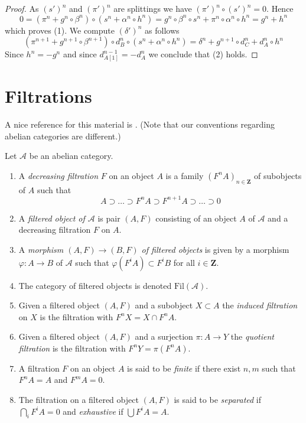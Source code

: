 \begin{proof}
As $(s')^n$ and $(\pi')^n$ are splittings we have $(\pi')^n \circ (s')^n = 0$.
Hence
$$
0 = ( \pi^n + g^n \circ \beta^n ) \circ ( s^n + \alpha^n \circ h^n ) =
g^n \circ \beta^n \circ s^n + \pi^n \circ \alpha^n \circ h^n =
g^n + h^n
$$
which proves (1). We compute $(\delta')^n$ as follows
$$
( \pi^{n + 1} + g^{n + 1} \circ \beta^{n + 1} )
\circ d_B^n \circ
( s^n + \alpha^n \circ h^n )
= \delta^n + g^{n + 1} \circ d_C^n + d_A^n \circ h^n
$$
Since $h^n = -g^n$ and since $d_{A[1]}^{n - 1} = -d_A^n$ we conclude that (2)
holds.
\end{proof}










\section{Filtrations}
\label{section-filtrations}

\noindent
A nice reference for this material is \cite[Section 1]{HodgeII}.
(Note that our conventions regarding abelian categories are different.)

\begin{definition}
\label{definition-filtered}
Let $\mathcal{A}$ be an abelian category.
\begin{enumerate}
\item A {\it decreasing filtration} $F$ on an object $A$
is a family $(F^nA)_{n \in \mathbf{Z}}$ of subobjects of $A$ such that
$$
A \supset \ldots \supset F^nA \supset F^{n + 1}A \supset \ldots \supset 0
$$
\item A {\it filtered object of $\mathcal{A}$} is
pair $(A, F)$ consisting of an object $A$ of $\mathcal{A}$
and a decreasing filtration $F$ on $A$.
\item A {\it morphism $(A, F) \to (B, F)$ of filtered objects}
is given by a morphism $\varphi : A \to B$ of $\mathcal{A}$
such that $\varphi(F^iA) \subset F^iB$ for all $i \in \mathbf{Z}$.
\item The category of filtered objects is denoted $\text{Fil}(\mathcal{A})$.
\item Given a filtered object $(A, F)$ and a subobject $X \subset A$ the
{\it induced filtration} on $X$ is the filtration with $F^nX = X \cap F^nA$.
\item Given a filtered object $(A, F)$ and a surjection
$\pi : A \to Y$ the {\it quotient filtration} is the filtration with
$F^nY = \pi(F^nA)$.
\item A filtration $F$ on an object $A$ is said to be {\it finite}
if there exist $n, m$ such that $F^nA = A$ and $F^mA = 0$.
\item  The filtration on a filtered object $(A, F)$ is said to be
{\it separated} if $\bigcap_i F^iA = 0$ and
{\it exhaustive} if $\bigcup F^iA = A$.
\end{enumerate}
\end{definition}

